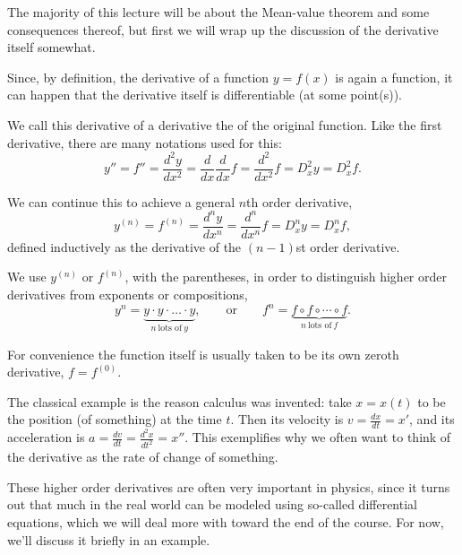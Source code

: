 The majority of this lecture will be about the Mean-value theorem and some consequences thereof, but first we will wrap up the discussion of the derivative itself somewhat.


Since, by definition, the derivative of a function $y = f(x)$ is again a function, it can happen that the derivative itself is differentiable (at some point(s)).

We call this derivative of a derivative the  of the original function.
Like the first derivative, there are many notations used for this:
\[
	y'' = f'' = \frac{d^2 y}{d x^2} = \frac{d}{d x} \frac{d}{d x} f = \frac{d^2}{d x^2} f = D_x^2 y = D_x^2 f.
\]

\noindent
We can continue this to achieve a general $n$th order derivative,
\[
	y^{(n)} = f^{(n)} = \frac{d^n y}{d x^n} = \frac{d^n}{d x^n} f = D_x^n y = D_x^n f,
\]
defined inductively as the derivative of the $(n - 1)$st order derivative.

\begin{remark}
	We use $y^{(n)}$ or $f^{(n)}$, with the parentheses, in order to distinguish higher order derivatives from exponents or compositions,
	\[
		y^n = \underbrace{y \cdot y \cdot \ldots \cdot y}_{n ~\text{lots of}~ y}, \qquad \text{or} \qquad  f^n = \underbrace{f \circ f \circ \cdots \circ f}_{n~\text{lots of}~f}.
	\]
\end{remark}

\noindent
For convenience the function itself is usually taken to be its own zeroth derivative, $f = f^{(0)}$.

\begin{example}
	The classical example is the reason calculus was invented: take $x = x(t)$ to be the position (of something) at the time $t$.
	Then its velocity is $v = \frac{d x}{d t} = x'$, and its acceleration is $a = \frac{d v}{d t} = \frac{d^2 x}{d t^2} = x''$.
	This exemplifies why we often want to think of the derivative as the rate of change of something.
\end{example}

\noindent
These higher order derivatives are often very important in physics, since it turns out that much in the real world can be modeled using so-called differential equations, which we will deal more with toward the end of the course.
For now, we'll discuss it briefly in an example.

